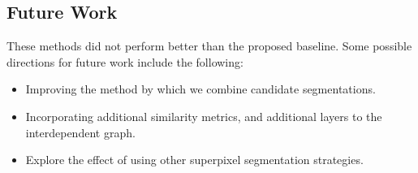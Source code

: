 \documentclass[twocolumn]{article}
\begin{document}
\subsection{Future Work}

These methods did not perform better than the proposed baseline. Some possible
directions for future work include the following:

\begin{itemize}
  \item Improving the method by which we combine candidate segmentations.
  \item Incorporating additional similarity metrics, and additional layers to the interdependent graph.
  \item Explore the effect of using other superpixel segmentation strategies.
\end{itemize}


 
\end{document}
